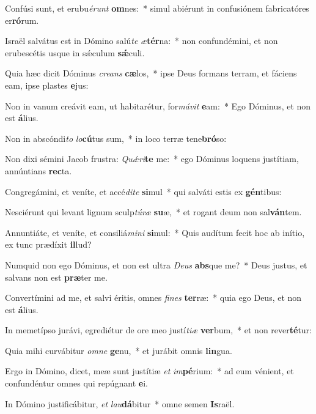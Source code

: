 \item Confúsi sunt, et erubu\textit{é}\textit{runt} \textbf{om}nes:~* simul abiérunt in confusiónem fabricatóres er\textbf{ró}rum.
\item Israël salvátus est in Dómino salú\textit{te} \textit{æ}\textbf{tér}na:~* non confundémini, et non erubescétis usque in sǽculum \textbf{sǽ}culi.
\item Quia hæc dicit Dóminus \textit{cre}\textit{ans} \textbf{cæ}los,~* ipse Deus formans terram, et fáciens eam, ipse plastes \textbf{e}jus:
\item Non in vanum creávit eam, ut habitarétur, for\textit{má}\textit{vit} \textbf{e}am:~* Ego Dóminus, et non est \textbf{á}lius.
\item Non in abscóndi\textit{to} \textit{lo}\textbf{cú}tus sum,~* in loco terræ tene\textbf{bró}so:
\item Non dixi sémini Jacob frustra: \textit{Quǽ}\textit{ri}\textbf{te} me:~* ego Dóminus loquens justítiam, annúntians \textbf{rec}ta.
\item Congregámini, et veníte, et accé\textit{di}\textit{te} \textbf{si}mul~* qui salváti estis ex \textbf{gén}tibus:
\item Nesciérunt qui levant lignum sculp\textit{tú}\textit{ræ} \textbf{su}æ,~* et rogant deum non sal\textbf{ván}tem.
\item Annuntiáte, et veníte, et consiliá\textit{mi}\textit{ni} \textbf{si}mul:~* Quis audítum fecit hoc ab inítio, ex tunc prædíxit \textbf{il}lud?
\item Numquid non ego Dóminus, et non est ultra \textit{De}\textit{us} \textbf{abs}que me?~* Deus justus, et salvans non est \textbf{præ}ter me.
\item Convertímini ad me, et salvi éritis, omnes \textit{fi}\textit{nes} \textbf{ter}ræ:~* quia ego Deus, et non est \textbf{á}lius.
\item In memetípso jurávi, egrediétur de ore meo justí\textit{ti}\textit{æ} \textbf{ver}bum,~* et non rever\textbf{té}tur:
\item Quia mihi curvábitur \textit{om}\textit{ne} \textbf{ge}nu,~* et jurábit omnis \textbf{lin}gua.
\item Ergo in Dómino, dicet, meæ sunt justítiæ \textit{et} \textit{im}\textbf{pé}rium:~* ad eum vénient, et confundéntur omnes qui repúgnant \textbf{e}i.
\item In Dómino justificábitur, \textit{et} \textit{lau}\textbf{dá}bitur~* omne semen \textbf{Is}raël.
